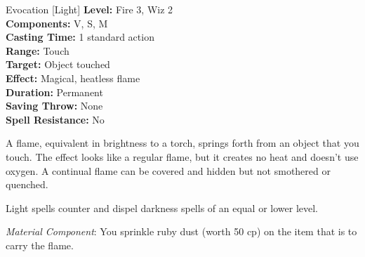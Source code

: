 {Evocation [Light]}
{
	\textbf{Level:}
	Fire 3, Wiz 2\\
	\textbf{Components:}
	V, S, M\\
	\textbf{Casting Time:}
	1 standard action\\
	\textbf{Range:}
	Touch\\
	\textbf{Target:}
	Object touched\\
	\textbf{Effect:}
	Magical, heatless flame\\
	\textbf{Duration:}
	Permanent\\
	\textbf{Saving Throw:}
	None\\
	\textbf{Spell Resistance:}
	No\\
}
{
	A flame, equivalent in brightness to a torch, springs forth from an object that you touch. The effect looks like a regular flame, but it creates no heat and doesn't use oxygen. A continual flame can be covered and hidden but not smothered or quenched.

	Light spells counter and dispel darkness spells of an equal or lower level.

	\textit{Material Component}:
	You sprinkle ruby dust (worth 50 cp) on the item that is to carry the flame.

}
